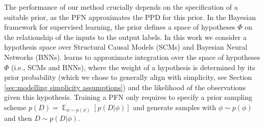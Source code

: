 \documentclass{article}
\DeclareMathOperator*{\E}{\mathbb{E}}
\begin{document}
The performance of our method crucially depends on the specification of a suitable prior, as the PFN approximates the PPD for this prior.
In the Bayesian framework for supervised learning, the prior defines a space of hypotheses $\Phi$ on the relationship of the inputs to the output labels.
In this work we consider a hypothesis space over Structural Causal Models (SCMs) and Bayesian Neural Networks (BNNs). \methodname{} learns to approximate integration over the space of hypotheses $\Phi$ (i.e., SCMs and BNNs), where the weight of a hypothesis is determined by its prior probability (which we chose to generally align with simplicity, see Section \ref{sec:modelling simplicity assumptions}) and the likelihood of the observations given this hypothesis.
Training a PFN only requires to specify a prior sampling scheme $p(D)=\E_{\phi \sim p(\phi)}[p(D|\phi)]$ and generate samples with $\phi \sim p(\phi)$ and then $D \sim p(D|\phi)$.
\end{document}
